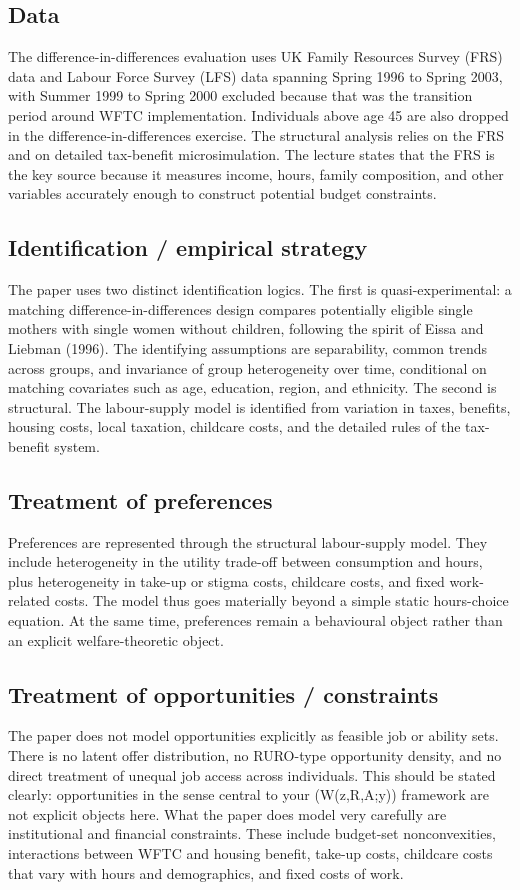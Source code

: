 \documentclass[11pt,a4paper]{article}
\begin{document}
\subsection*{Data}
The difference-in-differences evaluation uses UK Family Resources Survey (FRS) data and Labour Force Survey (LFS) data spanning Spring 1996 to Spring 2003, with Summer 1999 to Spring 2000 excluded because that was the transition period around WFTC implementation. Individuals above age 45 are also dropped in the difference-in-differences exercise. The structural analysis relies on the FRS and on detailed tax-benefit microsimulation. The lecture states that the FRS is the key source because it measures income, hours, family composition, and other variables accurately enough to construct potential budget constraints.

\subsection*{Identification / empirical strategy}
The paper uses two distinct identification logics. The first is quasi-experimental: a matching difference-in-differences design compares potentially eligible single mothers with single women without children, following the spirit of Eissa and Liebman (1996). The identifying assumptions are separability, common trends across groups, and invariance of group heterogeneity over time, conditional on matching covariates such as age, education, region, and ethnicity. The second is structural. The labour-supply model is identified from variation in taxes, benefits, housing costs, local taxation, childcare costs, and the detailed rules of the tax-benefit system.

\subsection*{Treatment of preferences}
Preferences are represented through the structural labour-supply model. They include heterogeneity in the utility trade-off between consumption and hours, plus heterogeneity in take-up or stigma costs, childcare costs, and fixed work-related costs. The model thus goes materially beyond a simple static hours-choice equation. At the same time, preferences remain a behavioural object rather than an explicit welfare-theoretic object.

\subsection*{Treatment of opportunities / constraints}
The paper does not model opportunities explicitly as feasible job or ability sets. There is no latent offer distribution, no RURO-type opportunity density, and no direct treatment of unequal job access across individuals. This should be stated clearly: opportunities in the sense central to your (W(z,R,A;y)) framework are not explicit objects here. What the paper does model very carefully are institutional and financial constraints. These include budget-set nonconvexities, interactions between WFTC and housing benefit, take-up costs, childcare costs that vary with hours and demographics, and fixed costs of work.
\end{document}
